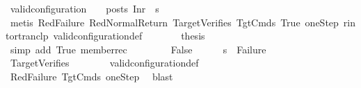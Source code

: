 \begin{isabellebody}
\ {\isachardoublequoteopen}valid{\isacharunderscore}{\kern0pt}configuration\ {\isasymLambda}\ {\isasymGamma}\ {\isasymOmega}\ posts\ {\isacharparenleft}{\kern0pt}Inr\ {\isacharparenleft}{\kern0pt}{\isacharparenright}{\kern0pt}{\isacharparenright}{\kern0pt}\ s{}{\isacharprime}{\kern0pt}{\isachardoublequoteclose}\isanewline
\ \ \ \ \ \ \isamarkupfalse%
\ {\isacharparenleft}{\kern0pt}metis\ RedFailure\ RedNormalReturn\ TargetVerifies\ TgtCmds\ True\ oneStep\ r{\isacharunderscore}{\kern0pt}into{\isacharunderscore}{\kern0pt}rtranclp\ valid{\isacharunderscore}{\kern0pt}configuration{\isacharunderscore}{\kern0pt}def{\isacharparenright}{\kern0pt}\isanewline
\ \ \ \ \isamarkupfalse%
\ \isamarkupfalse%
\ {\isacharquery}{\kern0pt}thesis\isanewline
\ \ \ \ \ \ \isamarkupfalse%
\ {\isacharparenleft}{\kern0pt}simp\ add{\isacharcolon}{\kern0pt}\ True\ member{\isacharunderscore}{\kern0pt}rec{\isacharparenleft}{\kern0pt}{}{\isacharparenright}{\kern0pt}{\isacharparenright}{\kern0pt}\isanewline
\ \ \isamarkupfalse%
\isanewline
\ \ \ \ \isamarkupfalse%
\ False\isanewline
\ \ \ \ \isamarkupfalse%
\ {\isachardoublequoteopen}s{}{\isacharprime}{\kern0pt}\ {\isasymnoteq}\ Failure{\isachardoublequoteclose}\isanewline
\ \ \ \ \ \ \isamarkupfalse%
\ TargetVerifies\isanewline
\ \ \ \ \ \ \isamarkupfalse%
\ valid{\isacharunderscore}{\kern0pt}configuration{\isacharunderscore}{\kern0pt}def\isanewline
\ \ \ \ \ \ \isamarkupfalse%
\ RedFailure\ TgtCmds\ oneStep\ \isamarkupfalse%
\ blast\isanewline
\ \ \ \ \isamarkupfalse%

\end{isabellebody}
